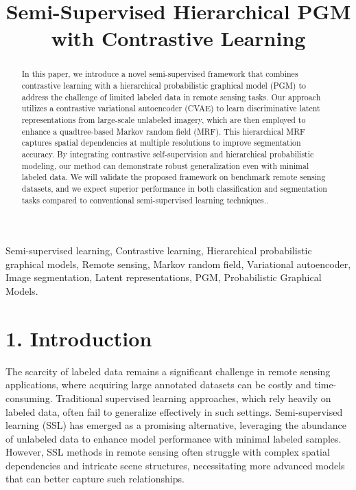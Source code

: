 \documentclass[conference]{IEEEtran}
\title{Semi-Supervised Hierarchical PGM with Contrastive Learning}
\author{
    \IEEEauthorblockN{Leonard Niyitegeka}
    \IEEEauthorblockA{Carnegie Mellon University Africa\\
    Email: lniyiteg@andrew.cmu.edu}
    \and
    \IEEEauthorblockN{Jules Udahemuka}
    \IEEEauthorblockA{Carnegie Mellon University Africa\\
    Email: judahemu@andrew.cmu.edu}
}
\begin{document}
\maketitle

\begin{abstract}
    In this paper, we introduce a novel semi-supervised framework that combines contrastive learning with a hierarchical probabilistic graphical model (PGM) to address the challenge of limited labeled data in remote sensing tasks. Our approach utilizes a contrastive variational autoencoder (CVAE) to learn discriminative latent representations from large-scale unlabeled imagery, which are then employed to enhance a quadtree-based Markov random field (MRF). This hierarchical MRF captures spatial dependencies at multiple resolutions to improve segmentation accuracy. By integrating contrastive self-supervision and hierarchical probabilistic modeling, our method can demonstrate robust generalization even with minimal labeled data. We will validate the proposed framework on benchmark remote sensing datasets, and we expect superior performance in both classification and segmentation tasks compared to conventional semi-supervised learning techniques..
\end{abstract}
\vspace{0.5cm}

\begin{IEEEkeywords}
    Semi-supervised learning, Contrastive learning, Hierarchical probabilistic graphical models, Remote sensing, Markov random field, Variational autoencoder, Image segmentation, Latent representations, PGM, Probabilistic Graphical Models.
\end{IEEEkeywords}

\section*{1. Introduction}

The scarcity of labeled data remains a significant challenge in remote sensing applications, where acquiring large annotated datasets can be costly and time-consuming\cite{paris2023remote}. Traditional supervised learning approaches, which rely heavily on labeled data, often fail to generalize effectively in such settings. Semi-supervised learning (SSL) has emerged as a promising alternative, leveraging the abundance of unlabeled data to enhance model performance with minimal labeled samples\cite{patel2022evaluating}. However, SSL methods in remote sensing often struggle with complex spatial dependencies and intricate scene structures, necessitating more advanced models that can better capture such relationships\cite{pastorino2021semantic}.
\end{document}

